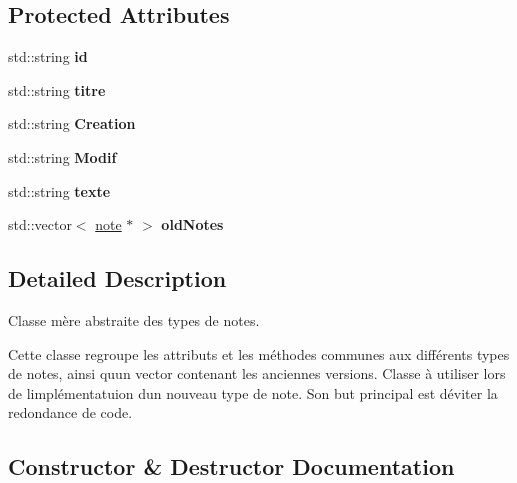 \subsection*{Protected Attributes}
\begin{DoxyCompactItemize}
\item 
\mbox{\label{classnote_a0d600e9189e2de40a0f598be7abf2383}} 
std\+::string {\bfseries id}
\item 
\mbox{\label{classnote_a5d6bc3a8fea49cec225f3715fe773a39}} 
std\+::string {\bfseries titre}
\item 
\mbox{\label{classnote_ad2368e2d1305df655be46f20dc022871}} 
std\+::string {\bfseries Creation}
\item 
\mbox{\label{classnote_a026b48f2e5b88d6cb832f5d23c0b52a7}} 
std\+::string {\bfseries Modif}
\item 
\mbox{\label{classnote_a1ae5b932bd6cd2360659548d814628c2}} 
std\+::string {\bfseries texte}
\item 
\mbox{\label{classnote_add61c3e248f40e52c83c8adb60a81516}} 
std\+::vector$<$ \hyperlink{classnote}{note} $\ast$ $>$ {\bfseries old\+Notes}
\end{DoxyCompactItemize}


\subsection{Detailed Description}
Classe mère abstraite des types de notes. 

Cette classe regroupe les attributs et les méthodes communes aux différents types de notes, ainsi qu\textquotesingle{}un vector contenant les anciennes versions. Classe à utiliser lors de l\textquotesingle{}implémentatuion d\textquotesingle{}un nouveau type de note. Son but principal est d\textquotesingle{}éviter la redondance de code. 

\subsection{Constructor \& Destructor Documentation}
\mbox{\label{classnote_a020b9fbf3603286e010cee5454195302}} 
